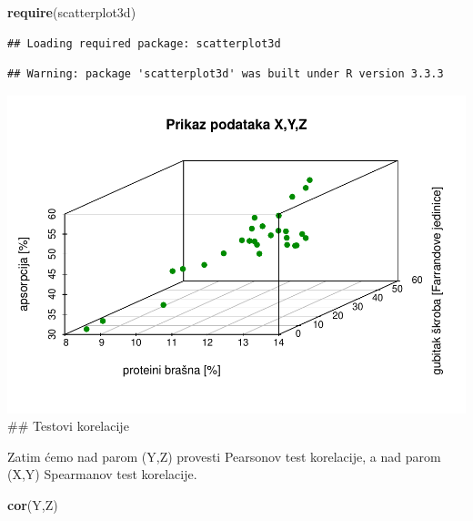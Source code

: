 \documentclass[]{article}
\newenvironment{Shaded}{\begin{snugshade}}{\end{snugshade}}
\newcommand{\KeywordTok}[1]{\textcolor[rgb]{0.13,0.29,0.53}{\textbf{{#1}}}}
\newcommand{\DataTypeTok}[1]{\textcolor[rgb]{0.13,0.29,0.53}{{#1}}}
\newcommand{\DecValTok}[1]{\textcolor[rgb]{0.00,0.00,0.81}{{#1}}}
\newcommand{\StringTok}[1]{\textcolor[rgb]{0.31,0.60,0.02}{{#1}}}
\newcommand{\NormalTok}[1]{{#1}}
\begin{document}
\begin{Shaded}
\begin{Highlighting}[]
\KeywordTok{require}\NormalTok{(scatterplot3d)}
\end{Highlighting}
\end{Shaded}

\begin{verbatim}
## Loading required package: scatterplot3d
\end{verbatim}

\begin{verbatim}
## Warning: package 'scatterplot3d' was built under R version 3.3.3
\end{verbatim}

\begin{Shaded}
\end{Shaded}

\includegraphics{Izvjestaj_files/figure-latex/unnamed-chunk-25-4.pdf}
\#\# Testovi korelacije

Zatim ćemo nad parom (Y,Z) provesti Pearsonov test korelacije, a nad
parom (X,Y) Spearmanov test korelacije.

\begin{Shaded}
\begin{Highlighting}[]
\KeywordTok{cor}\NormalTok{(Y,Z)}
\end{Highlighting}
\end{Shaded}
\end{document}

